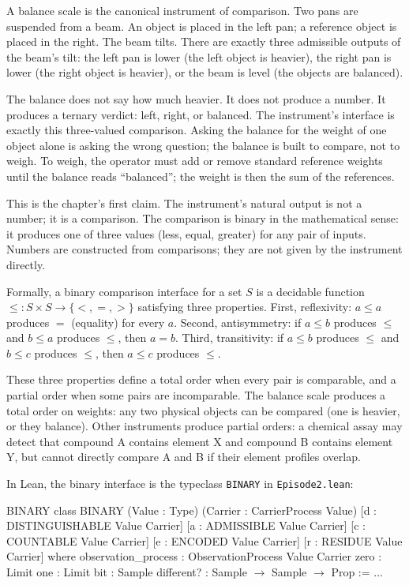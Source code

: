 A balance scale is the canonical instrument of comparison. Two pans are
suspended from a beam. An object is placed in the left pan; a reference
object is placed in the right. The beam tilts. There are exactly three
admissible outputs of the beam's tilt: the left pan is lower (the left
object is heavier), the right pan is lower (the right object is heavier),
or the beam is level (the objects are balanced).

The balance does not say how much heavier. It does not produce a number.
It produces a ternary verdict: left, right, or balanced. The instrument's
interface is exactly this three-valued comparison. Asking the balance for
the weight of one object alone is asking the wrong question; the balance
is built to compare, not to weigh. To weigh, the operator must add or
remove standard reference weights until the balance reads ``balanced'';
the weight is then the sum of the references.

This is the chapter's first claim. The instrument's natural output is
not a number; it is a comparison. The comparison is binary in the
mathematical sense: it produces one of three values (less, equal,
greater) for any pair of inputs. Numbers are constructed from
comparisons; they are not given by the instrument directly.

Formally, a binary comparison interface for a set $S$ is a decidable
function $\le : S \times S \to \{<, =, >\}$ satisfying three
properties. First, reflexivity: $a \le a$ produces $=$ (equality)
for every $a$. Second, antisymmetry: if $a \le b$ produces $\le$
and $b \le a$ produces $\le$, then $a = b$. Third, transitivity:
if $a \le b$ produces $\le$ and $b \le c$ produces $\le$, then
$a \le c$ produces $\le$.

These three properties define a total order when every pair is
comparable, and a partial order when some pairs are incomparable. The
balance scale produces a total order on weights: any two physical
objects can be compared (one is heavier, or they balance). Other
instruments produce partial orders: a chemical assay may detect
that compound A contains element X and compound B contains element
Y, but cannot directly compare A and B if their element profiles
overlap.

In Lean, the binary interface is the typeclass \texttt{BINARY} in
\texttt{Episode2.lean}:

\begin{leanexcerpt}{BINARY}
class BINARY
    (Value : Type)
    (Carrier : CarrierProcess Value)
    [d : DISTINGUISHABLE Value Carrier]
    [a : ADMISSIBLE Value Carrier]
    [c : COUNTABLE Value Carrier]
    [e : ENCODED Value Carrier]
    [r : RESIDUE Value Carrier]
  where
  observation_process : ObservationProcess Value Carrier
  zero : Limit
  one  : Limit
  bit  : Sample
  different? : Sample $\to$ Sample $\to$ Prop := ...
\end{leanexcerpt}

